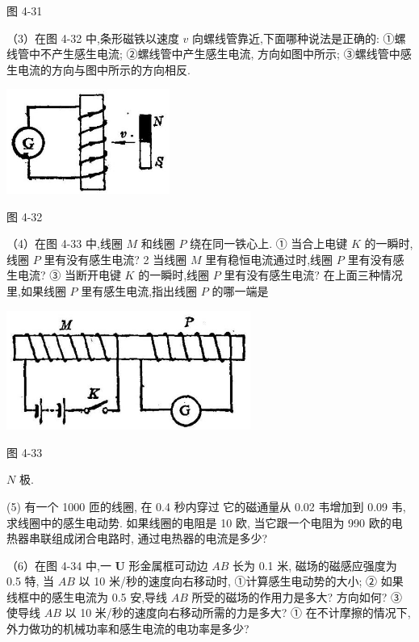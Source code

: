 \documentclass[10pt]{article}
\begin{document}
图 4-31

（3）在图 4-32 中,条形磁铁以速度 \(v\) 向螺线管靠近,下面哪种说法是正确的: ①螺线管中不产生感生电流; ②螺线管中产生感生电流, 方向如图中所示; ③螺线管中感生电流的方向与图中所示的方向相反.

\begin{center}
\includegraphics[max width=0.4\textwidth]{images/01913056-1f15-74d8-9184-9aab52c9d66b_155_162467.jpg}
\end{center}

图 4-32

（4）在图 4-33 中,线圈 \(M\) 和线圈 \(P\) 绕在同一铁心上. ① 当合上电键 \(K\) 的一瞬时,线圈 \(P\) 里有没有感生电流? 2 当线圈 \(M\) 里有稳恒电流通过时,线圈 \(P\) 里有没有感生电流? ③ 当断开电键 \(K\) 的一瞬时,线圈 \(P\) 里有没有感生电流? 在上面三种情况里,如果线圈 \(P\) 里有感生电流,指出线圈 \(P\) 的哪一端是

\begin{center}
\includegraphics[max width=0.6\textwidth]{images/01913056-1f15-74d8-9184-9aab52c9d66b_156_650467.jpg}
\end{center}

图 4-33

\(N\) 极.

(5) 有一个 1000 匝的线圈, 在 0.4 秒内穿过 它的磁通量从 0.02 韦增加到 0.09 韦, 求线圈中的感生电动势. 如果线圈的电阻是 10 欧, 当它跟一个电阻为 990 欧的电热器串联组成闭合电路时, 通过电热器的电流是多少?

（6）在图 4-34 中,一 \(\mathbf{U}\) 形金属框可动边 \({AB}\) 长为 0.1 米, 磁场的磁感应强度为 0.5 特, 当 \({AB}\) 以 10 米/秒的速度向右移动时, ①计算感生电动势的大小; ② 如果线框中的感生电流为 0.5 安,导线 \({AB}\) 所受的磁场的作用力是多大? 方向如何? ③使导线 \({AB}\) 以 10 米/秒的速度向右移动所需的力是多大? ① 在不计摩擦的情况下, 外力做功的机械功率和感生电流的电功率是多少?
\end{document}
